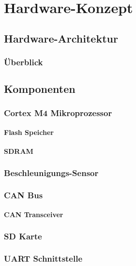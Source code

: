 %
%

\chapter{Hardware-Konzept}\label{chap.hardware}



\section{Hardware-Architektur}\label{sec.hw_arch}


\subsection{Überblick}


\section{Komponenten}

\subsection{Cortex M4 Mikroprozessor}

\subsubsection{Flash Speicher}

\subsubsection{SDRAM}


\subsection{Beschleunigungs-Sensor}

\subsection{CAN Bus}

\subsubsection{CAN Transceiver}


\subsection{SD Karte}

\subsection{UART Schnittstelle}
